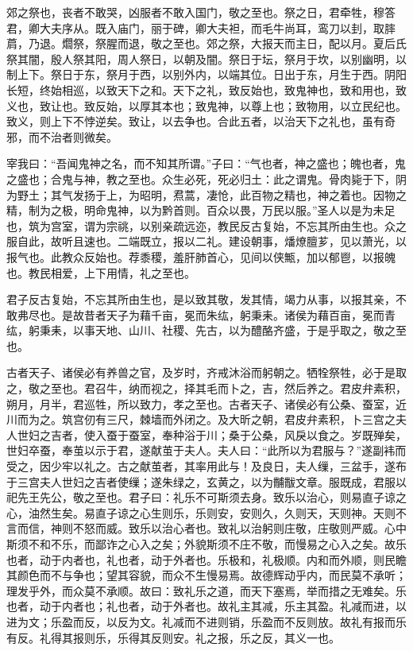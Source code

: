 \documentclass[]{article}
\begin{document}
郊之祭也，丧者不敢哭，凶服者不敢入国门，敬之至也。祭之日，君牵牲，穆答君，卿大夫序从。既入庙门，丽于碑，卿大夫袒，而毛牛尚耳，鸾刀以刲，取膟菺，乃退。爓祭，祭腥而退，敬之至也。郊之祭，大报天而主日，配以月。夏后氏祭其闇，殷人祭其阳，周人祭日，以朝及闇。祭日于坛，祭月于坎，以别幽明，以制上下。祭日于东，祭月于西，以别外内，以端其位。日出于东，月生于西。阴阳长短，终始相巡，以致天下之和。天下之礼，致反始也，致鬼神也，致和用也，致义也，致让也。致反始，以厚其本也；致鬼神，以尊上也；致物用，以立民纪也。致义，则上下不悖逆矣。致让，以去争也。合此五者，以治天下之礼也，虽有奇邪，而不治者则微矣。

宰我曰：``吾闻鬼神之名，而不知其所谓。''子曰：``气也者，神之盛也；魄也者，鬼之盛也；合鬼与神，教之至也。众生必死，死必归土：此之谓鬼。骨肉毙于下，阴为野土；其气发扬于上，为昭明，焄蒿，凄怆，此百物之精也，神之着也。因物之精，制为之极，明命鬼神，以为黔首则。百众以畏，万民以服。''圣人以是为未足也，筑为宫室，谓为宗祧，以别亲疏远迩，教民反古复始，不忘其所由生也。众之服自此，故听且速也。二端既立，报以二礼。建设朝事，燔燎膻芗，见以萧光，以报气也。此教众反始也。荐黍稷，羞肝肺首心，见间以侠甒，加以郁鬯，以报魄也。教民相爱，上下用情，礼之至也。

君子反古复始，不忘其所由生也，是以致其敬，发其情，竭力从事，以报其亲，不敢弗尽也。是故昔者天子为藉千亩，冕而朱纮，躬秉耒。诸侯为藉百亩，冕而青纮，躬秉耒，以事天地、山川、社稷、先古，以为醴酪齐盛，于是乎取之，敬之至也。

古者天子、诸侯必有养兽之官，及岁时，齐戒沐浴而躬朝之。牺牷祭牲，必于是取之，敬之至也。君召牛，纳而视之，择其毛而卜之，吉，然后养之。君皮弁素积，朔月，月半，君巡牲，所以致力，孝之至也。古者天子、诸侯必有公桑、蚕室，近川而为之。筑宫仞有三尺，棘墙而外闭之。及大昕之朝，君皮弁素积，卜三宫之夫人世妇之吉者，使入蚕于蚕室，奉种浴于川；桑于公桑，风戾以食之。岁既殚矣，世妇卒蚕，奉茧以示于君，遂献茧于夫人。夫人曰：``此所以为君服与？''遂副袆而受之，因少牢以礼之。古之献茧者，其率用此与！及良日，夫人缫，三盆手，遂布于三宫夫人世妇之吉者使缫；遂朱绿之，玄黄之，以为黼黻文章。服既成，君服以祀先王先公，敬之至也。君子曰：礼乐不可斯须去身。致乐以治心，则易直子谅之心，油然生矣。易直子谅之心生则乐，乐则安，安则久，久则天，天则神。天则不言而信，神则不怒而威。致乐以治心者也。致礼以治躬则庄敬，庄敬则严威。心中斯须不和不乐，而鄙诈之心入之矣；外貌斯须不庄不敬，而慢易之心入之矣。故乐也者，动于内者也，礼也者，动于外者也。乐极和，礼极顺。内和而外顺，则民瞻其颜色而不与争也；望其容貌，而众不生慢易焉。故德辉动乎内，而民莫不承听；理发乎外，而众莫不承顺。故曰：致礼乐之道，而天下塞焉，举而措之无难矣。乐也者，动于内者也；礼也者，动于外者也。故礼主其减，乐主其盈。礼减而进，以进为文；乐盈而反，以反为文。礼减而不进则销，乐盈而不反则放。故礼有报而乐有反。礼得其报则乐，乐得其反则安。礼之报，乐之反，其义一也。
\end{document}
